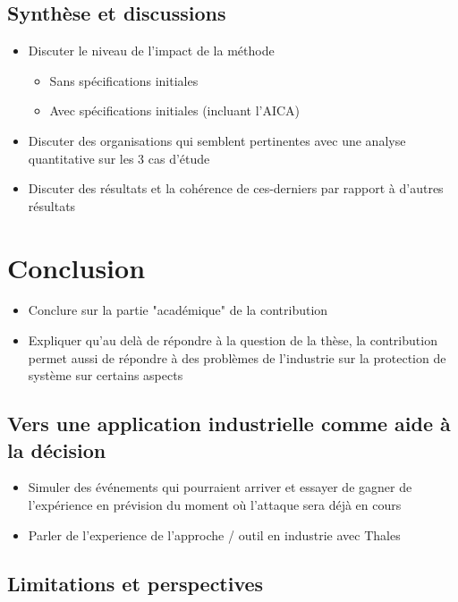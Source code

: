 \documentclass[runningheads]{llncs}
\begin{document}
\subsection{Synthèse et discussions}
\begin{itemize}

    \item Discuter le niveau de l'impact de la méthode
          \begin{itemize}
              \item Sans spécifications initiales
              \item Avec spécifications initiales (incluant l'AICA)
          \end{itemize}
    \item Discuter des organisations qui semblent pertinentes avec une analyse quantitative sur les 3 cas d'étude
    \item Discuter des résultats et la cohérence de ces-derniers par rapport à d'autres résultats
\end{itemize}



\section{Conclusion}
\begin{itemize}

    \item Conclure sur la partie "académique" de la contribution
    \item Expliquer qu'au delà de répondre à la question de la thèse, la contribution permet aussi de répondre à des problèmes de l'industrie sur la protection de système sur certains aspects
\end{itemize}

\subsection{Vers une application industrielle comme aide à la décision}
\begin{itemize}

    \item Simuler des événements qui pourraient arriver et essayer de gagner de l'expérience en prévision du moment où l’attaque sera déjà en cours
    \item Parler de l'experience de l'approche / outil en industrie avec Thales
\end{itemize}

\subsection{Limitations et perspectives}
\end{document}
